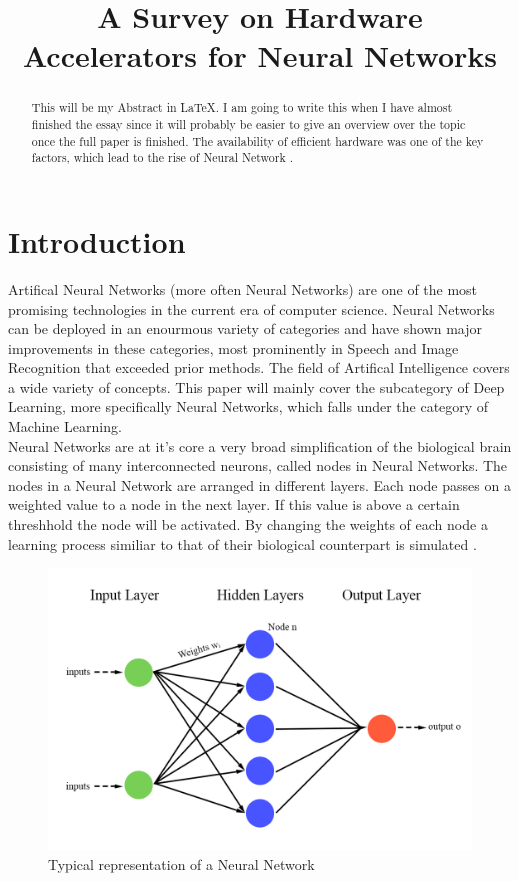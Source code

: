 \documentclass[conference]{IEEEtran}
\begin{document}
\title{A Survey on Hardware Accelerators for Neural Networks}
\author{
}

\maketitle

\begin{abstract}
This will be my Abstract in \LaTeX.
I am going to write this when I have almost finished the essay since it will probably be easier to give an overview over the topic once the full paper is finished.
The availability of efficient hardware was one of the key factors, which lead to the rise of Neural Network \cite{historyfpgas}. 
\\
\end{abstract}

\section{Introduction}
Artifical Neural Networks (more often Neural Networks) are one of the most promising technologies in the current era of computer science. Neural Networks can be deployed in an enourmous variety of categories and have shown major improvements in these categories, most prominently in Speech and Image Recognition \cite{speech_recognition1} that exceeded prior methods. The field of Artifical Intelligence covers a wide variety of concepts. This paper will mainly cover the subcategory of Deep Learning, more specifically Neural Networks, which falls under the category of Machine Learning. 
\\
Neural Networks are at it's core a very broad simplification of the biological brain consisting of many interconnected neurons, called nodes in Neural Networks. The nodes in a Neural Network are  arranged in different layers. Each node passes on a weighted value to a node in the next layer. If this value is above a certain threshhold the node will be activated. By changing the weights of each node a learning process similiar to that of their biological counterpart is simulated \cite{nn_basics}.
\begin{figure}[h]
	\caption{Typical representation of a Neural Network}
	\centering
	\includegraphics[width=\linewidth]{pictures/neuralnetwork.png}
\end{figure}
\end{document}
